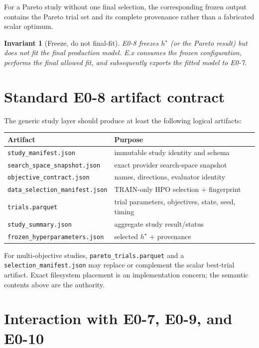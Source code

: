 \documentclass[11pt]{article}
\newtheorem{invariant}{Invariant}
\begin{document}
For a Pareto study without one final selection, the corresponding frozen output
contains the Pareto trial set and its complete provenance rather than a
fabricated scalar optimum.

\begin{invariant}[Freeze, do not final-fit]
E0-8 freezes $h^{\star}$ (or the Pareto result) but does not fit the final
production model. E.x consumes the frozen configuration, performs the final
allowed fit, and subsequently exports the fitted model to E0-7.
\end{invariant}

\section{Standard E0-8 artifact contract}

The generic study layer should produce at least the following logical artifacts:
\begin{center}
\begin{tabular}{ll}
\toprule
Artifact & Purpose\\
\midrule
\texttt{study\_manifest.json} & immutable study identity and schema\\
\texttt{search\_space\_snapshot.json} & exact provider search-space snapshot\\
\texttt{objective\_contract.json} & names, directions, evaluator identity\\
\texttt{data\_selection\_manifest.json} & TRAIN-only HPO selection + fingerprint\\
\texttt{trials.parquet} & trial parameters, objectives, state, seed, timing\\
\texttt{study\_summary.json} & aggregate study result/status\\
\texttt{frozen\_hyperparameters.json} & selected $h^{\star}$ + provenance\\
\bottomrule
\end{tabular}
\end{center}
For multi-objective studies, \texttt{pareto\_trials.parquet} and a
\texttt{selection\_manifest.json} may replace or complement the scalar
best-trial artifact. Exact filesystem placement is an implementation concern;
the semantic contents above are the authority.

\section{Interaction with E0-7, E0-9, and E0-10}
\end{document}
